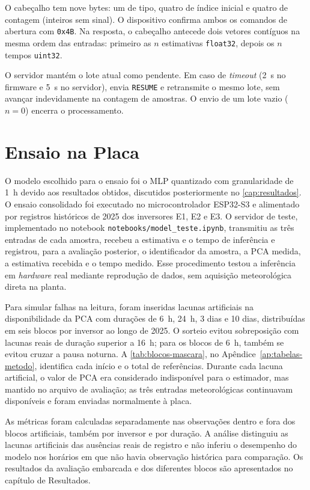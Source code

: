 O cabeçalho tem nove bytes: um de tipo, quatro de índice inicial e quatro de
contagem (inteiros sem sinal). O dispositivo confirma ambos os comandos de
abertura com \texttt{0x4B}. Na resposta, o cabeçalho antecede dois vetores
contíguos na mesma ordem das entradas: primeiro as $n$ estimativas
\texttt{float32}, depois os $n$ tempos \texttt{uint32}.

O servidor mantém o lote atual como pendente. Em caso de \textit{timeout}
(2~s no firmware e 5~s no servidor), envia \texttt{RESUME} e retransmite o
mesmo lote, sem avançar indevidamente na contagem de amostras. O envio de um
lote vazio ($n=0$) encerra o processamento.

\section{Ensaio na Placa}

O modelo escolhido para o ensaio foi o MLP quantizado com granularidade de
1~h devido aos resultados obtidos, discutidos posteriormente no
\cref{cap:resultados}. O ensaio consolidado foi executado no
microcontrolador ESP32-S3 e alimentado por registros históricos de 2025 dos
inversores E1, E2 e E3. O servidor de teste, implementado no notebook
\texttt{notebooks/model\_teste.ipynb}, transmitiu as três entradas de cada
amostra, recebeu a estimativa e o tempo de inferência e registrou, para a
avaliação posterior, o identificador da amostra, a PCA medida, a estimativa
recebida e o tempo medido. Esse procedimento testou a inferência em \textit{hardware}
real mediante reprodução de dados, sem aquisição meteorológica direta na
planta.

Para simular falhas na leitura, foram inseridas lacunas artificiais na
disponibilidade da PCA com durações de 6~h, 24~h, 3 dias e 10 dias,
distribuídas em seis blocos por inversor ao longo de 2025. O sorteio evitou
sobreposição com lacunas reais de duração superior a 16~h; para os blocos de
6~h, também se evitou cruzar a pausa noturna. A \cref{tab:blocos-mascara}, no Apêndice~\ref{ap:tabelas-metodo},
identifica cada início e o total de referências. Durante cada lacuna
artificial, o valor de PCA era considerado indisponível para o estimador,
mas mantido no arquivo de avaliação; as três entradas meteorológicas
continuavam disponíveis e foram enviadas normalmente à placa.

As métricas foram calculadas separadamente nas observações dentro e fora dos
blocos artificiais, também por inversor e por duração. A análise distinguiu
as lacunas artificiais das ausências reais de registro e não inferiu o
desempenho do modelo nos horários em que não havia observação histórica para
comparação. Os resultados da avaliação embarcada e dos diferentes blocos são
apresentados no capítulo de Resultados.

